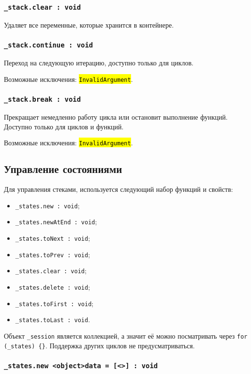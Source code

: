 \documentclass[a4paper, 14pt]{extarticle}
\newcommand{\ferror}[1]{\foreignlanguage{english}{\fontsize{11pt}{12pt}\tt{\sethlcolor{yellow}\hl{#1}}}}
\newenvironment{icItems}
	{ \begin{itemize} [noitemsep,nolistsep] }
	{ \end{itemize} }
\begin{document}
\subsubsection{\lstinline|_stack.clear : void|}

Удаляет все переменные, которые хранится в контейнере.

\subsubsection{\lstinline|_stack.continue : void|}

Переход на следующую итерацию, доступно только для циклов.

Возможные исключения: \ferror{InvalidArgument}.

\subsubsection{\lstinline|_stack.break : void|}

Прекращает немедленно работу цикла или остановит выполнение функций. Доступно только для циклов и функций.

Возможные исключения: \ferror{InvalidArgument}.

\subsection{Управление состояниями}

Для управления стеками, используется следующий набор функций и свойств:
\begin{icItems}
	\item \lstinline|_states.new : void|;
	\item \lstinline|_states.newAtEnd : void|;
	\item \lstinline|_states.toNext : void|;
	\item \lstinline|_states.toPrev : void|;
	\item \lstinline|_states.clear : void|;
	\item \lstinline|_states.delete : void|;
	\item \lstinline|_states.toFirst : void|;
	\item \lstinline|_states.toLast : void|.
\end{icItems}

Объект \lstinline|_session| является коллекцией, а значит её можно посматривать через \lstinline|for (_states) {}|. Поддержка других циклов не предусматриваться.

\subsubsection{\lstinline|_states.new <object>data = [<>] : void|}
\end{document}
